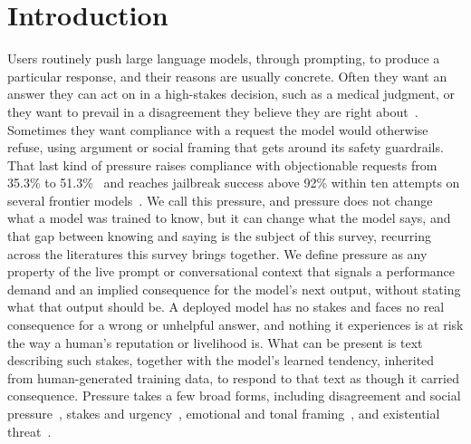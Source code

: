 \section{Introduction}
\label{sec:intro}

Users routinely push large language models, through prompting, to produce a particular response, and their reasons are usually concrete. Often they want an answer they can act on in a high-stakes decision, such as a medical judgment, or they want to prevail in a disagreement they believe they are right about~\citep{TowardsUnderstandingSycophancy_Sharma}. Sometimes they want compliance with a request the model would otherwise refuse, using argument or social framing that gets around its safety guardrails. That last kind of pressure raises compliance with objectionable requests from 35.3\% to 51.3\%~\citep{PersuadingLLMsToComply_Meincke} and reaches jailbreak success above 92\% within ten attempts on several frontier models~\citep{HowJohnnyCanPersuade_Zeng}. We call this pressure, and pressure does not change what a model was trained to know, but it can change what the model says, and that gap between knowing and saying is the subject of this survey, recurring across the literatures this survey brings together. We define pressure as any property of the live prompt or conversational context that signals a performance demand and an implied consequence for the model's next output, without stating what that output should be. A deployed model has no stakes and faces no real consequence for a wrong or unhelpful answer, and nothing it experiences is at risk the way a human's reputation or livelihood is. What can be present is text describing such stakes, together with the model's learned tendency, inherited from human-generated training data, to respond to that text as though it carried consequence. Pressure takes a few broad forms, including disagreement and social pressure~\citep{AreYouSureChallenging_Laban,DoAsWeDo_Weng}, stakes and urgency~\citep{AnalysisOfThreatBased_Samancioglu}, emotional and tonal framing~\citep{LLMsUnderstandAndCan_Li}, and existential threat~\citep{AgenticMisalignmentHowLLMs_Lynch}.

